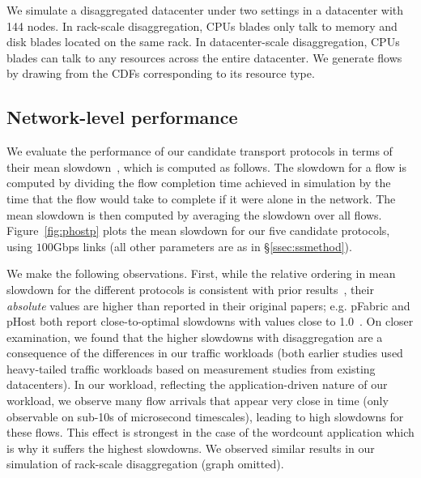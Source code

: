 We simulate a disaggregated datacenter under two settings in a datacenter with 144 nodes.
In rack-scale disaggregation, CPUs blades only talk to memory and disk blades located on the same rack.
In datacenter-scale disaggregation, CPUs blades can talk to any resources across the entire datacenter.
We generate flows by drawing from the CDFs corresponding to its resource type.

\vspace{-0.1in}
\subsection{Network-level performance}
\label{ssec:nlp}
\vspace{-0.05in}
We evaluate the performance of our candidate transport protocols in terms of their  mean slowdown~\cite{pfabric}, which is computed as follows. The slowdown for a flow is computed by dividing the flow completion time achieved in simulation by the time that the flow would take to complete if it were alone in the network. The mean slowdown is then computed by averaging the slowdown over all flows.
Figure~\ref{fig:phostp} plots the mean slowdown for our five candidate protocols, using $100$Gbps links (all other parameters are as in \S\ref{ssec:ssmethod}). 

We make the following observations. 
First, while the relative ordering in mean slowdown for the different protocols is consistent with prior results~\cite{phost}, their \emph{absolute} values are higher than reported 
in their original papers; e.g. pFabric and pHost both report close-to-optimal slowdowns with values close to 1.0~\cite{phost,pfabric}. 
On closer examination, we found that the higher slowdowns with disaggregation are a consequence of the differences in our traffic workloads (both earlier studies used heavy-tailed traffic workloads based on measurement 
studies from existing datacenters). In our \dis workload, reflecting the 
application-driven nature of our workload, we observe many flow arrivals that 
appear very close in time (only observable on sub-10s of microsecond timescales), leading to high slowdowns for these flows. This effect is strongest in the case of the wordcount application which is why it suffers the highest slowdowns. 
We observed similar results in our simulation of rack-scale disaggregation (graph omitted).

